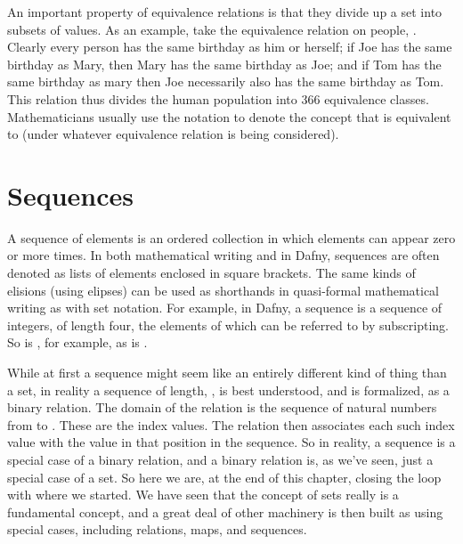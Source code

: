 \documentclass[letterpaper,10pt,english]{sphinxmanual}
\begin{document}
An important property of equivalence relations is that they divide up
a set into subsets of  values. As an example, take the
equivalence relation on people, . Clearly every
person has the same birthday as him or herself; if Joe has the same
birthday as Mary, then Mary has the same birthday as Joe; and if Tom
has the same birthday as mary then Joe necessarily also has the same
birthday as Tom. This relation thus divides the human population into
366 equivalence classes. Mathematicians usually use the notation  to denote the concept that  is equivalent to  (under whatever
equivalence relation is being considered).


\section{Sequences}
\label{\detokenize{07-set-theory:sequences}}
A sequence of elements is an ordered collection in which elements can
appear zero or more times. In both mathematical writing and in Dafny,
sequences are often denoted as lists of elements enclosed in square
brackets.  The same kinds of elisions (using elipses) can be used as
shorthands in quasi-formal mathematical writing as with set notation.
For example, in Dafny, a sequence  is a sequence of
integers, of length four, the elements of which can be referred to by
subscripting. So  is , for example, as is .

While at first a sequence might seem like an entirely different kind
of thing than a set, in reality a sequence of length, , is best
understood, and is formalized, as a binary relation. The domain of the
relation is the sequence of natural numbers from  to .  These
are the index values. The relation then associates each such index
value with the value in that position in the sequence. So in reality,
a sequence is a special case of a binary relation, and a binary
relation is, as we’ve seen, just a special case of a set.  So here we
are, at the end of this chapter, closing the loop with where we
started. We have seen that the concept of sets really is a fundamental
concept, and a great deal of other machinery is then built as using
special cases, including relations, maps, and sequences.
\end{document}
